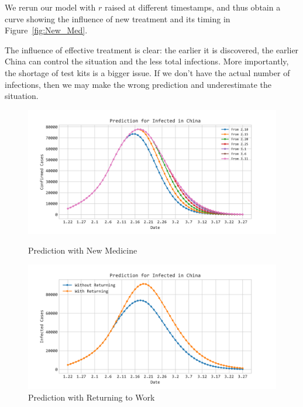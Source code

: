 \documentclass[12pt]{mcmthesis}
\begin{document}
We rerun our model with $r$ raised at different timestamps, and thus obtain a curve showing the influence of new treatment and its timing in Figure~\ref{fig:New_Med}.


The influence of effective treatment is clear: the earlier it is discovered, the earlier China can control the situation and the less total infections. More importantly, the shortage of test kits is a bigger issue. If we don't have the actual number of infections, then we may make the wrong prediction and underestimate the situation.

\begin{figure}[htbp]
    \centering
        \begin{minipage}[c]{0.48\textwidth}
            \includegraphics[width=1.0\textwidth]{053/figure/Prediction_New_Medicine.png}
            \caption{Prediction with New Medicine}
            \label{fig:New_Med}
        \end{minipage}
        \begin{minipage}[c]{0.48\textwidth}
            \includegraphics[width=1.0\textwidth]{053/figure/Prediction_WithReturning.png}
            \caption{Prediction with Returning to Work }
            \label{fig:Return}
        \end{minipage}
\end{figure}
\end{document}
